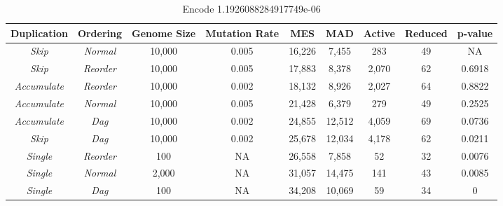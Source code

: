 \documentclass[journal]{IEEEtran}
\begin{document}
\begin{table*}
	\centering
	\begin{tabular}{|c|c|c|c|c|c|c|c|c|}
	  \hline
\textbf{Duplication} & \textbf{Ordering} & \textbf{Genome Size} & \textbf{Mutation Rate} & \textbf{MES} & \textbf{MAD} & \textbf{Active} & \textbf{Reduced} & \textbf{p-value} \\ \hline
\rowcolor{Gray}
\emph{Skip} & \emph{Normal}        & 10,000 & 0.005 & 16,226 & 7,455  &   283 & 49 & NA \\ \hline
\emph{Skip} & \emph{Reorder}       & 10,000 & 0.005 & 17,883 & 8,378  & 2,070 & 62 & 0.6918 \\ \hline
\emph{Accumulate} & \emph{Reorder} & 10,000 & 0.002 & 18,132 & 8,926  & 2,027 & 64 & 0.8822 \\ \hline
\emph{Accumulate} & \emph{Normal}  & 10,000 & 0.005 & 21,428 & 6,379  &   279 & 49 & 0.2525 \\ \hline
\emph{Accumulate} & \emph{Dag}     & 10,000 & 0.002 & 24,855 & 12,512 & 4,059 & 69 & 0.0736 \\ \hline
\emph{Skip} & \emph{Dag}           & 10,000 & 0.002 & 25,678 & 12,034 & 4,178 & 62 & 0.0211 \\ \hline
\emph{Single} & \emph{Reorder}     & 100    & NA    & 26,558 & 7,858  &    52 & 32 & 0.0076 \\ \hline
\emph{Single} & \emph{Normal}      & 2,000  & NA    & 31,057 & 14,475 &   141 & 43 & 0.0085 \\ \hline
\emph{Single} & \emph{Dag}         & 100    & NA    & 34,208 & 10,069 &    59 & 34 & 0 \\ \hline
	\end{tabular}
	\caption{Encode 1.1926088284917749e-06}
	\label{tab:encode}
\end{table*}
\end{document}
